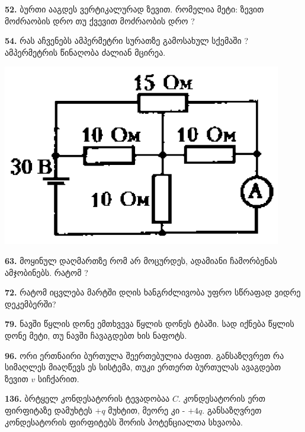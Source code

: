 \documentclass[12pt,a4paper,]{report}
\begin{document}
\textbf{52.} ბურთი ააგდეს ვერტიკალურად ზევით. რომელია მეტი: ზევით მოძრაობის დრო თუ ქვევით მოძრაობის დრო ?

\textbf{54.} რას აჩვენებს ამპერმეტრი სურათზე გამოსახულ სქემაში ? ამპერმეტრის წინაღობა ძალიან მცირეა. 
		\begin{center}
			\includegraphics[scale=0.4]{images/54.png}
		\end{center}
	
\textbf{63.} მოყინულ დაღმართზე რომ არ მოცურდეს, ადამიანი ჩამორბენას ამჯობინებს. რატომ ? 

\textbf{72.} რატომ იცვლება მარტში დღის ხანგრძლივობა უფრო სწრაფად ვიდრე დეკემბერში?

\textbf{79.} ნავში წყლის დონე ემთხვევა წყლის დონეს ტბაში. სად იქნება წყლის დონე მეტი, თუ ნავში ჩავაგდებთ ხის ნაფოტს.
	
\textbf{96.} ორი ერთნაირი ბურთულა შეერთებულია ძაფით. განსაზღვრეთ რა სიმაღლეს მიაღწევს ეს სისტემა, თუკი ერთერთ ბურთულას ავაგდებთ ზევით $v$ სიჩქარით. 

\textbf{136.} ბრტყელ კონდესატორის ტევადობაა $C$. კონდესატორის ერთ ფირფიტაზე დამუხტეს $+q$ მუხტით, მეორე კი - $+4q$. განსაზღვრეთ კონდესატორის ფირფიტებს შორის პოტენციალთა სხვაობა.
\end{document}
